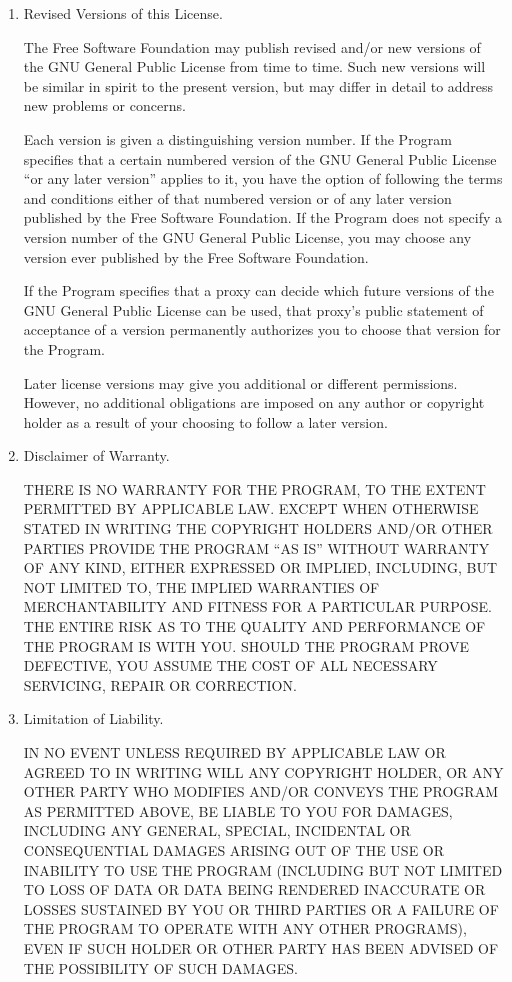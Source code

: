 \documentclass[12pt,a4paper]{book}
\begin{document}
\begin{enumerate}
\item Revised Versions of this License.

The Free Software Foundation may publish revised and/or new versions of
the GNU General Public License from time to time.  Such new versions will
be similar in spirit to the present version, but may differ in detail to
address new problems or concerns.

Each version is given a distinguishing version number.  If the
Program specifies that a certain numbered version of the GNU General
Public License ``or any later version'' applies to it, you have the
option of following the terms and conditions either of that numbered
version or of any later version published by the Free Software
Foundation.  If the Program does not specify a version number of the
GNU General Public License, you may choose any version ever published
by the Free Software Foundation.

If the Program specifies that a proxy can decide which future
versions of the GNU General Public License can be used, that proxy's
public statement of acceptance of a version permanently authorizes you
to choose that version for the Program.

Later license versions may give you additional or different
permissions.  However, no additional obligations are imposed on any
author or copyright holder as a result of your choosing to follow a
later version.

\item Disclaimer of Warranty.

\begin{sloppypar}
 THERE IS NO WARRANTY FOR THE PROGRAM, TO THE EXTENT PERMITTED BY
 APPLICABLE LAW.  EXCEPT WHEN OTHERWISE STATED IN WRITING THE
 COPYRIGHT HOLDERS AND/OR OTHER PARTIES PROVIDE THE PROGRAM ``AS IS''
 WITHOUT WARRANTY OF ANY KIND, EITHER EXPRESSED OR IMPLIED,
 INCLUDING, BUT NOT LIMITED TO, THE IMPLIED WARRANTIES OF
 MERCHANTABILITY AND FITNESS FOR A PARTICULAR PURPOSE.  THE ENTIRE
 RISK AS TO THE QUALITY AND PERFORMANCE OF THE PROGRAM IS WITH YOU.
 SHOULD THE PROGRAM PROVE DEFECTIVE, YOU ASSUME THE COST OF ALL
 NECESSARY SERVICING, REPAIR OR CORRECTION.
\end{sloppypar}

\item Limitation of Liability.

 IN NO EVENT UNLESS REQUIRED BY APPLICABLE LAW OR AGREED TO IN
 WRITING WILL ANY COPYRIGHT HOLDER, OR ANY OTHER PARTY WHO MODIFIES
 AND/OR CONVEYS THE PROGRAM AS PERMITTED ABOVE, BE LIABLE TO YOU FOR
 DAMAGES, INCLUDING ANY GENERAL, SPECIAL, INCIDENTAL OR CONSEQUENTIAL
 DAMAGES ARISING OUT OF THE USE OR INABILITY TO USE THE PROGRAM
 (INCLUDING BUT NOT LIMITED TO LOSS OF DATA OR DATA BEING RENDERED
 INACCURATE OR LOSSES SUSTAINED BY YOU OR THIRD PARTIES OR A FAILURE
 OF THE PROGRAM TO OPERATE WITH ANY OTHER PROGRAMS), EVEN IF SUCH
 HOLDER OR OTHER PARTY HAS BEEN ADVISED OF THE POSSIBILITY OF SUCH
 DAMAGES.


\end{enumerate}
\end{document}
